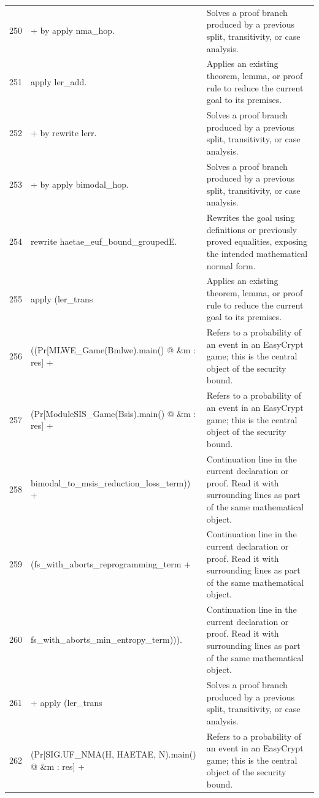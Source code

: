 \documentclass[10pt]{article}
\begin{document}
\begin{longtable}{r L{0.53\textwidth} L{0.37\textwidth}}
250 & {\ttfamily\scriptsize   + by apply nma\_hop.} & Solves a proof branch produced by a previous split, transitivity, or case analysis. \\
251 & {\ttfamily\scriptsize   apply ler\_add.} & Applies an existing theorem, lemma, or proof rule to reduce the current goal to its premises. \\
252 & {\ttfamily\scriptsize   + by rewrite lerr.} & Solves a proof branch produced by a previous split, transitivity, or case analysis. \\
253 & {\ttfamily\scriptsize   + by apply bimodal\_hop.} & Solves a proof branch produced by a previous split, transitivity, or case analysis. \\
254 & {\ttfamily\scriptsize rewrite haetae\_euf\_bound\_groupedE.} & Rewrites the goal using definitions or previously proved equalities, exposing the intended mathematical normal form. \\
255 & {\ttfamily\scriptsize apply (ler\_trans} & Applies an existing theorem, lemma, or proof rule to reduce the current goal to its premises. \\
256 & {\ttfamily\scriptsize   ((Pr[MLWE\_Game(Bmlwe).main() @ \&m : res] +} & Refers to a probability of an event in an EasyCrypt game; this is the central object of the security bound. \\
257 & {\ttfamily\scriptsize       (Pr[ModuleSIS\_Game(Bsis).main() @ \&m : res] +} & Refers to a probability of an event in an EasyCrypt game; this is the central object of the security bound. \\
258 & {\ttfamily\scriptsize         bimodal\_to\_msis\_reduction\_loss\_term)) +} & Continuation line in the current declaration or proof.  Read it with surrounding lines as part of the same mathematical object. \\
259 & {\ttfamily\scriptsize     (fs\_with\_aborts\_reprogramming\_term +} & Continuation line in the current declaration or proof.  Read it with surrounding lines as part of the same mathematical object. \\
260 & {\ttfamily\scriptsize       fs\_with\_aborts\_min\_entropy\_term))).} & Continuation line in the current declaration or proof.  Read it with surrounding lines as part of the same mathematical object. \\
261 & {\ttfamily\scriptsize + apply (ler\_trans} & Solves a proof branch produced by a previous split, transitivity, or case analysis. \\
262 & {\ttfamily\scriptsize     (Pr[SIG.UF\_NMA(H, HAETAE, N).main() @ \&m : res] +} & Refers to a probability of an event in an EasyCrypt game; this is the central object of the security bound. \\

\end{longtable}
\end{document}
